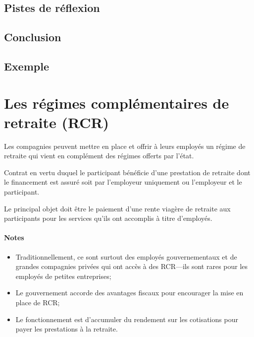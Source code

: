 \documentclass[10pt, french]{article}
\begin{document}
\begin{multicols*}{3}
\subsection*{Pistes de réflexion}

\subsection*{Conclusion}

\subsection*{Exemple}

\newpage

\section{Les régimes complémentaires de retraite (RCR)}

Les compagnies peuvent mettre en place et offrir à leurs employés un régime de retraite qui vient en complément des régimes offerts par l'état. 

\begin{definitionNOHFILL}

\begin{description}[leftmargin = *]
	\item[Globalement] Contrat en vertu duquel le participant bénéficie d'une prestation de retraite dont le financement est assuré soit par l'employeur uniquement ou l'employeur et le participant.
	\item[Selon la loi] Le principal objet doit être le paiement d'une rente viagère de retraite aux participants pour les services qu'ils ont accomplis à titre d'employés.
\end{description}

\paragraph{Notes}
\begin{itemize}[leftmargin = *]
	\item	Traditionnellement, ce sont surtout des employés gouvernementaux et de grandes compagnies privées qui ont accès à des RCR---ils sont rares pour les employés de petites entreprises;
	\item	Le gouvernement accorde des avantages fiscaux pour encourager la mise en place de RCR;
	\item	Le fonctionnement est d'accumuler du rendement sur les cotisations pour payer les prestations à la retraite.
\end{itemize}
\end{definitionNOHFILL}

\end{multicols*}
\end{document}
